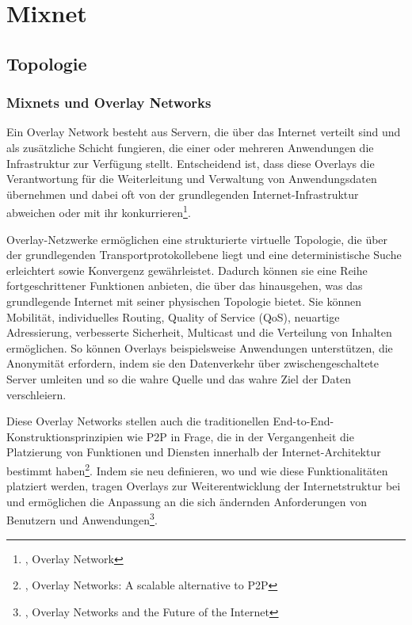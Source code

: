 \section{Mixnet}

\subsection{Topologie}

\subsubsection{Mixnets und Overlay Networks}

Ein Overlay Network besteht aus Servern, die über das Internet verteilt sind und als zusätzliche Schicht fungieren, die einer oder mehreren Anwendungen die Infrastruktur zur Verfügung stellt. Entscheidend ist, dass diese Overlays die Verantwortung für die Weiterleitung und Verwaltung von Anwendungsdaten übernehmen und dabei oft von der grundlegenden Internet-Infrastruktur abweichen oder mit ihr konkurrieren\footnote{\cite{OverlayNetwork}, Overlay Network}.

Overlay-Netzwerke ermöglichen eine strukturierte virtuelle Topologie, die über der grundlegenden Transportprotokollebene liegt und eine deterministische Suche erleichtert sowie Konvergenz gewährleistet. Dadurch können sie eine Reihe fortgeschrittener Funktionen anbieten, die über das hinausgehen, was das grundlegende Internet mit seiner physischen Topologie bietet. Sie können Mobilität, individuelles Routing, Quality of Service (QoS), neuartige Adressierung, verbesserte Sicherheit, Multicast und die Verteilung von Inhalten ermöglichen. So können Overlays beispielsweise Anwendungen unterstützen, die Anonymität erfordern, indem sie den Datenverkehr über zwischengeschaltete Server umleiten und so die wahre Quelle und das wahre Ziel der Daten verschleiern.

Diese Overlay Networks stellen auch die traditionellen End-to-End-Konstruktionsprinzipien wie P2P in Frage, die in der Vergangenheit die Platzierung von Funktionen und Diensten innerhalb der Internet-Architektur bestimmt haben\footnote{\cite{AlternativeToP2P}, Overlay Networks: A scalable alternative to P2P}. Indem sie neu definieren, wo und wie diese Funktionalitäten platziert werden, tragen Overlays zur Weiterentwicklung der Internetstruktur bei und ermöglichen die Anpassung an die sich ändernden Anforderungen von Benutzern und Anwendungen\footnote{\cite{FutureOfTheInternet}, Overlay Networks and the Future of the Internet}.

